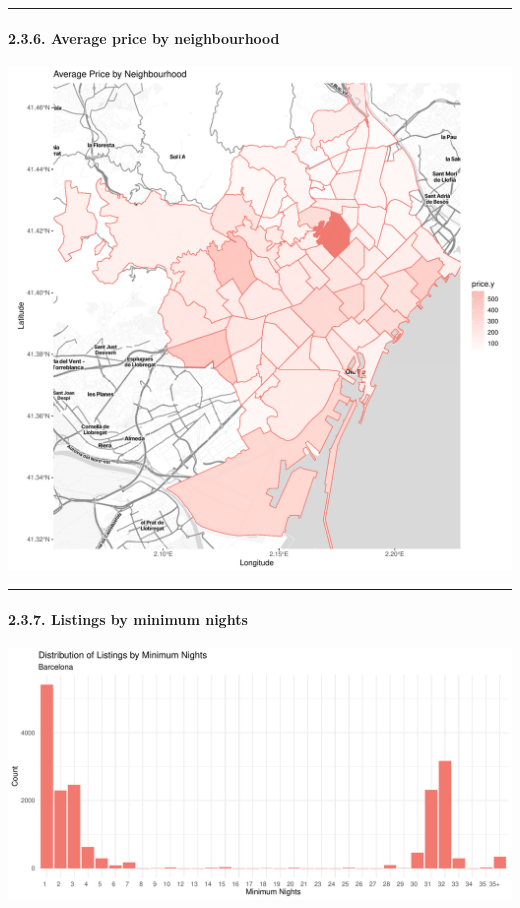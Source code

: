 \documentclass[
]{article}
\begin{document}
\begin{center}\rule{0.5\linewidth}{0.5pt}\end{center}

\hypertarget{average-price-by-neighbourhood}{%
\paragraph{2.3.6. Average price by
neighbourhood}\label{average-price-by-neighbourhood}}

\begin{center}\includegraphics{Barcelona-AirBnB-Insights_files/figure-latex/plot6-1} \end{center}

\begin{center}\rule{0.5\linewidth}{0.5pt}\end{center}

\hypertarget{listings-by-minimum-nights}{%
\paragraph{2.3.7. Listings by minimum
nights}\label{listings-by-minimum-nights}}

\begin{center}\includegraphics{Barcelona-AirBnB-Insights_files/figure-latex/plot7-1} \end{center}
\end{document}
